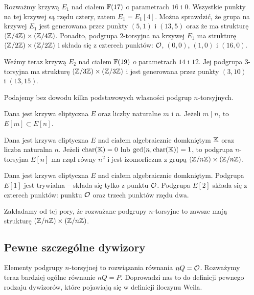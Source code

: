 \begin{example}
Rozważmy krzywą $E_1$ nad ciałem $\mathbb{F}(17)$ o parametrach $16$ i $0$.
Wszystkie punkty na tej krzywej są rzędu cztery,
zatem $E_1 = E_1[4]$.
Można sprawdzić,
że grupa na krzywej $E_1$ jest generowana przez punkty $(5, 1)$ i $(13, 5)$
oraz że ma strukturę $(\mathbb{Z} / 4\mathbb{Z})\times(\mathbb{Z} / 4\mathbb{Z})$.
Ponadto, podgrupa $2$-torsyjna na krzywej $E_1$
ma strukturę $(\mathbb{Z} / 2\mathbb{Z})\times(\mathbb{Z} / 2\mathbb{Z})$
i składa się z czterech punktów:
$\mathcal{O}$, $(0, 0)$, $(1, 0)$ i $(16, 0)$.

\noindent
Weźmy teraz krzywą $E_2$ nad ciałem $\mathbb{F}(19)$ o parametrach $14$ i $12$.
Jej podgrupa $3$-torsyjna ma strukturę $(\mathbb{Z} / 3\mathbb{Z})\times(\mathbb{Z} / 3\mathbb{Z})$
i jest generowana przez punkty $(3, 10)$ i $(13, 15)$.
\end{example}

\noindent
Podajemy bez dowodu kilka podstawowych własności podgrup $n$-torsyjnych.

\begin{fact}
Dana jest krzywa eliptyczna $E$
oraz liczby naturalne $m$ i $n$.
Jeżeli $m \mid n$, to $E[m] \subset E[n]$.
\end{fact}

\begin{theorem}\label{torsion_subgroup_isomorphic_zn_zn}
Dana jest krzywa eliptyczna $E$ nad ciałem algebraicznie domkniętym $\mathbb{K}$
oraz liczba naturalna $n$.
Jeżeli $\operatorname{char}(\mathbb{K}) = 0$ lub $\gcd(n, \operatorname{char}(\mathbb{K})) = 1$,
to podgrupa $n$-torsyjna $E[n]$ ma rząd równy $n^2$
i jest izomorficzna z grupą $(\mathbb{Z} / n\mathbb{Z})\times(\mathbb{Z} / n\mathbb{Z})$.
\end{theorem}

\begin{corollary}
Dana jest krzywa eliptyczna $E$ nad ciałem algebraicznie domkniętym.
Podgrupa $E[1]$ jest trywialna -- składa się tylko z punktu $\mathcal{O}$.
Podgrupa $E[2]$ składa się z czterech punktów:
punktu $\mathcal{O}$ oraz trzech punktów rzędu dwa.
\end{corollary}

\begin{remark}
Zakładamy od tej pory,
że rozważane podgrupy $n$-torsyjne
to zawsze mają strukturę $(\mathbb{Z} / n\mathbb{Z}) \times (\mathbb{Z} / n\mathbb{Z})$.
\end{remark}

\subsection*{Pewne szczególne dywizory}

\noindent
Elementy podgrupy $n$-torsyjnej to rozwiązania równania $nQ = \mathcal{O}$.
Rozważymy teraz bardziej ogólne równanie $nQ = P$.
Doprowadzi nas to do definicji pewnego rodzaju dywizorów,
które pojawiają się w definicji iloczynu Weila.

